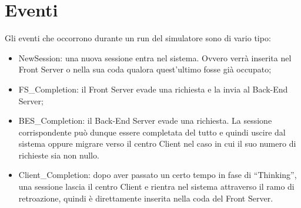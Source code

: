 \section{Eventi}
Gli eventi che occorrono durante un run del simulatore sono di vario tipo:
\begin{itemize}
\item NewSession: una nuova sessione entra nel sistema. Ovvero verrà inserita nel Front Server o nella sua coda qualora quest'ultimo fosse già occupato;
\item FS\_Completion: il Front Server evade una richiesta e la invia al Back-End Server;
\item BES\_Completion: il Back-End Server evade una richiesta. La sessione corrispondente può dunque essere completata del tutto e quindi uscire dal sistema oppure migrare verso il centro Client nel caso in cui il suo numero di richieste sia non nullo.
\item Client\_Completion: dopo aver passato un certo tempo in fase di “Thinking”, una sessione lascia il centro Client e rientra nel sistema attraverso il ramo di retroazione, quindi è direttamente inserita nella coda del Front Server.
\end{itemize}
